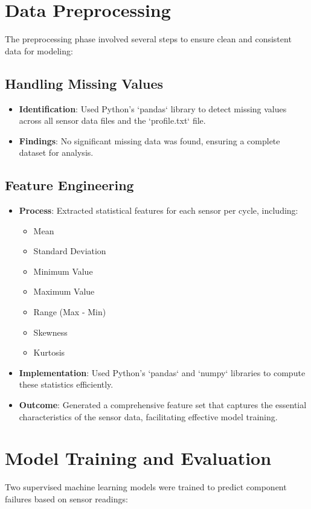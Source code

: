 \documentclass[sigconf]{acmart}
\begin{document}
\section{Data Preprocessing} 
The preprocessing phase involved several steps to ensure clean and consistent data for modeling:

\subsection{Handling Missing Values} 
\begin{itemize} 
    \item \textbf{Identification}: Used Python's `pandas` library to detect missing values across all sensor data files and the `profile.txt` file.
    \item \textbf{Findings}: No significant missing data was found, ensuring a complete dataset for analysis.
\end{itemize}

\subsection{Feature Engineering} 
\begin{itemize} 
    \item \textbf{Process}: Extracted statistical features for each sensor per cycle, including:
    \begin{itemize} 
        \item Mean
        \item Standard Deviation
        \item Minimum Value
        \item Maximum Value
        \item Range (Max - Min)
        \item Skewness
        \item Kurtosis
    \end{itemize}
    \item \textbf{Implementation}: Used Python's `pandas` and `numpy` libraries to compute these statistics efficiently.
    \item \textbf{Outcome}: Generated a comprehensive feature set that captures the essential characteristics of the sensor data, facilitating effective model training.
\end{itemize}

\section{Model Training and Evaluation}
Two supervised machine learning models were trained to predict component failures based on sensor readings:
\end{document}
